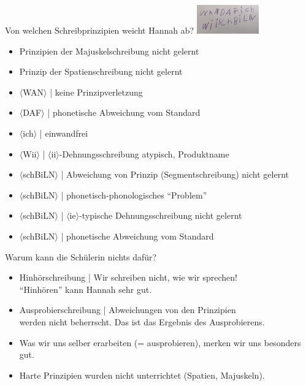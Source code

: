 \newcommand{\graphem}[1]{\ensuremath{\langle}#1\ensuremath{\rangle}}

\begin{frame}
  {Von welchen Schreibprinzipien weicht Hannah ab?}
  \centering 
  \includegraphics[width=0.2\textwidth]{graphics/wii}\\
  \Halbzeile
  \raggedright
  \begin{itemize}[<+->]
    \item Prinzipien der \alert{Majuskelschreibung} nicht gelernt
    \item Prinzip der \alert{Spatienschreibung} nicht gelernt
    \item \alert{\graphem{WAN}} | \alert{keine} Prinzipverletzung
    \item \alert{\graphem{DAF}} | \alert{phonetische} Abweichung vom Standard
    \item \alert{\graphem{ich}} | einwandfrei
    \item \alert{\graphem{Wii}} | \graphem{ii}-Dehnungsschreibung atypisch, \alert{Produktname}
    \item \graphem{\alert{sch}BiLN} | \alert{Abweichung von Prinzip} (Segmentschreibung) nicht gelernt
    \item \graphem{sch\alert{B}iLN} | \alert{phonetisch-phonologisches} "`Problem"'
    \item \graphem{schB\alert{i}LN} | \graphem{ie}-typische Dehnungsschreibung nicht gelernt
    \item \graphem{schBiL\alert{N}} | \alert{phonetische} Abweichung vom Standard
  \end{itemize}
\end{frame}

\begin{frame}
  {Warum kann die Schülerin nichts dafür?}
  \begin{itemize}[<+->]
    \item \alert{Hinhörschreibung} | Wir schreiben nicht, wie wir sprechen!\\
      "`Hinhören"' kann Hannah sehr gut.
      \Zeile
    \item \alert{Ausprobierschreibung} | \alert{Abweichungen von den Prinzipien}\\
      werden nicht beherrscht. Das ist das Ergebnis des Ausprobierens.
    \item Was wir uns selber erarbeiten (= ausprobieren), merken wir uns besonders gut.
      \Zeile
    \item Harte Prinzipien wurden nicht unterrichtet (Spatien, Majuskeln).
  \end{itemize}
\end{frame}

